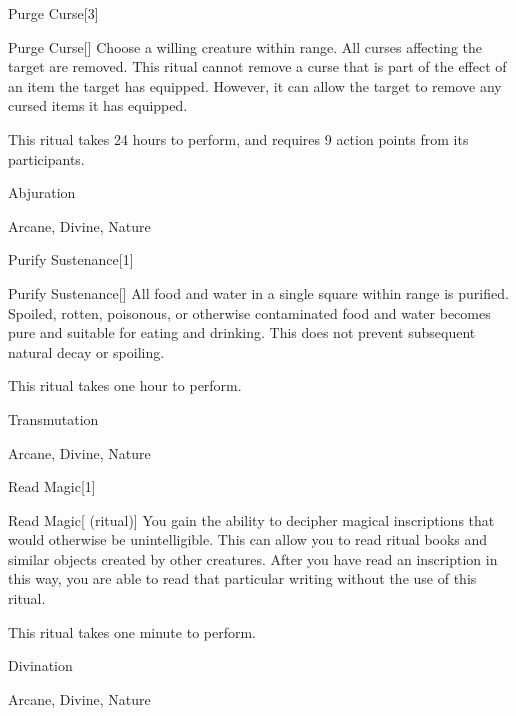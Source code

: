 \begin{spellsection}{Purge Curse}[3]


\begin{ability}{Purge Curse}[]
Choose a willing creature within \rngclose range.
All curses affecting the target are removed.
This ritual cannot remove a curse that is part of the effect of an item the target has equipped.
However, it can allow the target to remove any cursed items it has equipped.

This ritual takes 24 hours to perform, and requires 9 action points from its participants.
\end{ability}




 Abjuration

 Arcane, Divine, Nature
\end{spellsection}


\begin{spellsection}{Purify Sustenance}[1]


\begin{ability}{Purify Sustenance}[]
All food and water in a single square within \rngclose range is purified.
Spoiled, rotten, poisonous, or otherwise contaminated food and water becomes pure and suitable for eating and drinking.
This does not prevent subsequent natural decay or spoiling.

This ritual takes one hour to perform.
\end{ability}




 Transmutation

 Arcane, Divine, Nature
\end{spellsection}


\begin{spellsection}{Read Magic}[1]


\begin{ability}{Read Magic}[ (ritual)]
You gain the ability to decipher magical inscriptions that would otherwise be unintelligible.
This can allow you to read ritual books and similar objects created by other creatures.
After you have read an inscription in this way, you are able to read that particular writing without the use of this ritual.

This ritual takes one minute to perform.
\end{ability}




 Divination

 Arcane, Divine, Nature
\end{spellsection}


